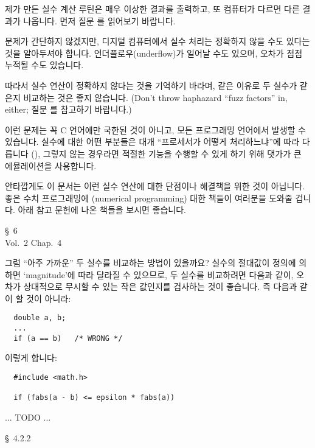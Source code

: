 \begin{faq}
	제가 만든 실수 계산 루틴은 매우 이상한 결과를 출력하고, 또
	컴퓨터가 다르면 다른 결과가 나옵니다.
\A
	먼저 질문 를 읽어보기 바랍니다.

	문제가 간단하지 않겠지만, 디지털 컴퓨터에서 실수 처리는
	정확하지 않을 수도 있다는 것을 알아두셔야 합니다.
	언더플로우(underflow)가 일어날 수도 있으며, 오차가 점점 누적될
	수도 있습니다.

	따라서 실수 연산이 정확하지 않다는 것을 기억하기 바라며,
	같은 이유로 두 실수가 같은지 비교하는 것은 좋지 않습니다.
	(Don't throw haphazard ``fuzz factors'' in, either; 질문 를
	참고하기 바랍니다.)

	이런 문제는 꼭 C 언어에만 국한된 것이 아니고, 모든 프로그래밍
	언어에서 발생할 수 있습니다.  실수에 대한 어떤 부분들은 대개
	``프로세서가 어떻게 처리하느냐''에 따라 다릅니다
	(), 그렇지 않는 경우라면 적절한 기능을 수행할 수 있게
	하기 위해 댓가가 큰 에뮬레이션을 사용합니다.

	안타깝게도 이 문서는 이런 실수 연산에 대한 단점이나 해결책을 위한
	것이 아닙니다.  좋은 수치 프로그래밍에 (numerical programming) 대한
	책들이 여러분을 도와줄 겁니다.  아래 참고 문헌에 나온 책들을
	보시면 좋습니다.

\R
	\cite{elemprog} \S\ 6  \\
	\cite{knuth} Vol.\ 2 Chap.\ 4 \\
	\cite{fpoint}
\end{faq}

\begin{faq}
	그럼 ``아주 가까운'' 두 실수를 비교하는 방법이 있을까요?
\A
	실수의 절대값이 정의에 의하면 `magnitude'에 따라 달라질 수 있으므로,
	두 실수를 비교하려면 다음과 같이, 오차가 상대적으로 무시할 수 있는
	작은 값인지를 검사하는 것이 좋습니다.  즉 다음과 같이 할 것이 아니라:

\begin{verbatim}
  double a, b;
  ...
  if (a == b)	/* WRONG */
\end{verbatim}

	\noindent 이렇게 합니다:

\begin{verbatim}
  #include <math.h>

  if (fabs(a - b) <= epsilon * fabs(a))
\end{verbatim}
	... TODO ...


\R
	\cite{knuth} \S\ 4.2.2 
\end{faq}


